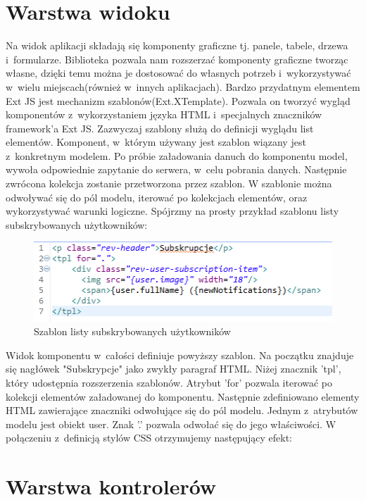\section{Warstwa widoku}

Na widok aplikacji składają się komponenty graficzne tj. panele, tabele, drzewa i~formularze. Biblioteka pozwala nam rozszerzać komponenty graficzne tworząc własne, dzięki temu można je dostosować do własnych potrzeb i~wykorzystywać w~wielu miejscach(również w~innych aplikacjach). Bardzo przydatnym elementem Ext JS jest mechanizm szablonów(Ext.XTemplate). Pozwala on tworzyć wygląd komponentów z~wykorzystaniem języka HTML i~specjalnych znaczników framework'a Ext JS. Zazwyczaj szablony służą do definicji wyglądu list elementów. Komponent, w~którym używany jest szablon wiązany jest z~konkretnym modelem. Po próbie załadowania danuch do komponentu model, wywoła odpowiednie zapytanie do serwera, w~celu pobrania danych. Następnie zwrócona kolekcja zostanie przetworzona przez szablon. W szablonie można odwoływać się do pól modelu, iterować po kolekcjach elementów, oraz wykorzystywać warunki logiczne. Spójrzmy na prosty przykład szablonu listy subskrybowanych użytkowników:
 
\begin{figure}[H]
	\centering
	\includegraphics[width=\textwidth]{images/tpl.png}
	\caption{Szablon listy subskrybowanych użytkowników}
\end{figure}

Widok komponentu w~całości definiuje powyższy szablon. Na początku znajduje się nagłówek "Subskrypcje" jako zwykły paragraf HTML. Niżej znacznik 'tpl', który udostępnia rozszerzenia szablonów. Atrybut 'for' pozwala iterować po kolekcji elementów załadowanej do komponentu. Następnie zdefiniowano elementy HTML zawierające znaczniki odwołujące się do pól modelu. Jednym z~atrybutów modelu jest obiekt user. Znak '.' pozwala odwołać się do jego właściwości. W połączeniu z~definicją stylów CSS otrzymujemy następujący efekt:
 


\section{Warstwa kontrolerów}

